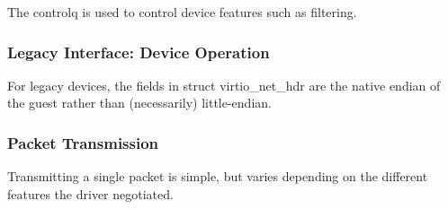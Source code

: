 The controlq is used to control device features such as
filtering.

\subsubsection{Legacy Interface: Device Operation}\label{sec:Device Types / Network Device / Device Operation / Legacy Interface: Device Operation}
For legacy devices, the fields in struct virtio_net_hdr are the
native endian of the guest rather than (necessarily) little-endian.

\subsubsection{Packet Transmission}\label{sec:Device Types / Network Device / Device Operation / Packet Transmission}

Transmitting a single packet is simple, but varies depending on
the different features the driver negotiated.

